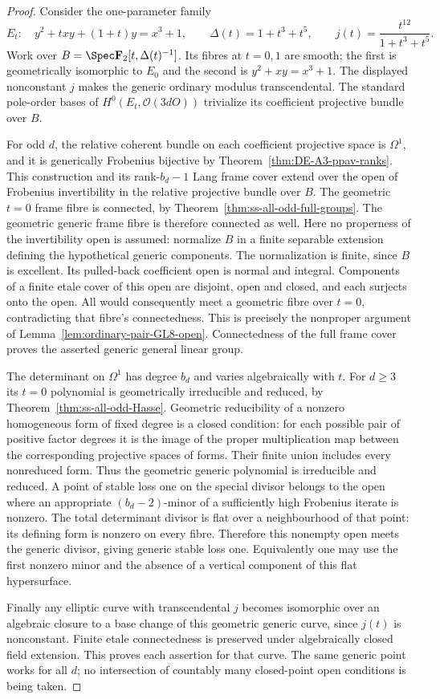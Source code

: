 \begin{proof}
Consider the one-parameter family
\[
 E_t:\quad y^2+txy+(1+t)y=x^3+1,
 \qquad \Delta(t)=1+t^3+t^5,
 \qquad j(t)=\frac{t^{12}}{1+t^3+t^5}.
\]
Work over $B=\Spec\mathbf F_2[t,\Delta(t)^{-1}]$.
Its fibres at $t=0,1$ are smooth; the first is geometrically
isomorphic to $E_0$ and the second is
$y^2+xy=x^3+1$. The displayed nonconstant $j$ makes the generic
ordinary modulus transcendental. The standard pole-order bases
of $H^0(E_t,\mathcal O(3dO))$ trivialize its coefficient projective
bundle over $B$.

For odd $d$, the relative coherent bundle on each coefficient
projective space is $\Omega^1$, and it is generically Frobenius
bijective by Theorem~\ref{thm:DE-A3-ppav-ranks}. This construction
and its rank-$b_d-1$ Lang frame cover extend over the open of
Frobenius invertibility in the relative projective bundle over
$B$. The geometric $t=0$ frame fibre is connected, by
Theorem~\ref{thm:ss-all-odd-full-groups}. The geometric generic
frame fibre is therefore connected as well. Here no properness
of the invertibility open is assumed: normalize $B$ in a finite
separable extension defining the hypothetical generic components.
The normalization is finite, since $B$ is excellent. Its pulled-back
coefficient open is normal and integral. Components of a finite
etale cover of this open are disjoint, open and closed, and each
surjects onto the open. All would consequently meet a geometric
fibre over $t=0$, contradicting that fibre's connectedness.
This is precisely the nonproper argument of
Lemma~\ref{lem:ordinary-pair-GL8-open}.
Connectedness of the full frame cover proves the asserted generic
general linear group.

The determinant on $\Omega^1$ has degree $b_d$ and varies
algebraically with $t$. For $d\ge3$ its $t=0$ polynomial is
geometrically irreducible and reduced, by
Theorem~\ref{thm:ss-all-odd-Hasse}. Geometric reducibility of
a nonzero homogeneous form of fixed degree is a closed condition:
for each possible pair of positive factor degrees it is the image
of the proper multiplication map between the corresponding
projective spaces of forms. Their finite union includes every
nonreduced form. Thus the geometric generic polynomial is
irreducible and reduced. A point of stable loss one on the
special divisor belongs to the open where an appropriate
$(b_d-2)$-minor of a sufficiently high Frobenius iterate is
nonzero. The total determinant divisor is flat over a
neighbourhood of that point: its defining form is nonzero on
every fibre. Therefore this nonempty open meets the generic
divisor, giving generic stable loss one. Equivalently one may
use the first nonzero minor and the absence of a vertical
component of this flat hypersurface.

Finally any elliptic curve with transcendental $j$ becomes
isomorphic over an algebraic closure to a base change of this
geometric generic curve, since $j(t)$ is nonconstant.
Finite etale connectedness is preserved under algebraically
closed field extension. This proves each assertion for that
curve. The same generic point works for all $d$; no intersection
of countably many closed-point open conditions is being taken.
\end{proof}

